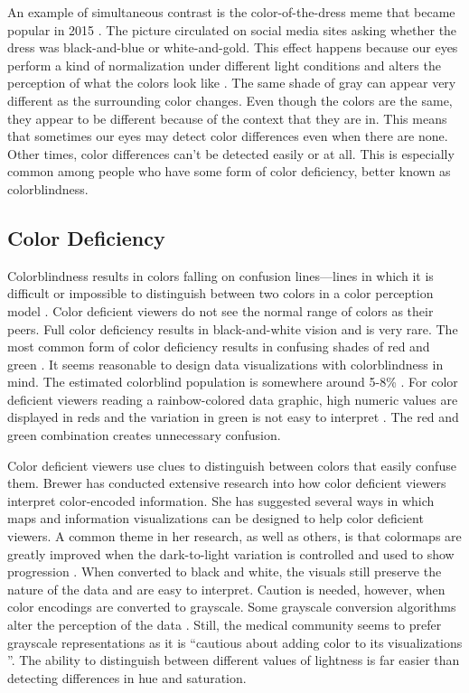 \documentclass[journal,12pt]{IEEEtran}
\begin{document}
An example of simultaneous contrast is the 
color-of-the-dress meme that became popular in 2015 \cite{colorofthedress}. The picture
circulated on social media sites asking whether the dress was black-and-blue
or white-and-gold. This effect happens because our eyes perform a kind 
of normalization under different light conditions and alters
the perception of what the colors look like \cite{viridis}.
The same shade of gray can appear very different as the surrounding color changes.
Even though the colors are the same, they appear to be 
different because of the context that they are in. This means that sometimes
our eyes may detect color differences even when there are none.
Other times, color differences can't be detected easily or at all. This is 
especially common among people who have some form of color deficiency,
better known as colorblindness.

\subsection{Color Deficiency}

Colorblindness results in colors falling on confusion lines---lines in which it
is difficult or impossible to distinguish between two colors in a color perception model \cite{colormapping}.
Color deficient viewers do not see the normal range of colors as their peers.
Full color deficiency results in black-and-white vision and is very rare.
The most common form of color deficiency results in confusing shades of red and green \cite{colorchoice}.
It seems reasonable to design data
visualizations with colorblindness in mind.
The estimated colorblind population is somewhere around 5-8\%
 \cite{colormapping,mapcvi,rainbowstill,spectralschemes,colorvblackwhite,matlab}.
For color deficient viewers reading a rainbow-colored data graphic,
high numeric values are displayed in reds and
the variation in green is not easy to interpret \cite{mapcvi}. The red and green
combination creates unnecessary confusion.

Color deficient viewers use clues to distinguish between colors that easily confuse them.
Brewer has conducted extensive research into how color deficient
viewers interpret color-encoded information. She has suggested several ways in which 
maps and information visualizations can be designed to help color deficient viewers.
A common theme in her research, as well as others, is that colormaps are greatly
improved when the dark-to-light variation is controlled and used to show progression \cite{mapcvi}.
When converted to black and white, the visuals still preserve the nature of the data and are easy to interpret.
Caution is needed, however, when color encodings are converted to
grayscale. Some grayscale conversion algorithms alter the perception of the data \cite{colorvblackwhite}.
Still, the medical community seems to prefer grayscale representations as it is ``cautious about adding color
to its visualizations \cite{endofrainbow}''. The ability to distinguish between different values of lightness is
far easier than detecting differences in hue and saturation.
\end{document}
